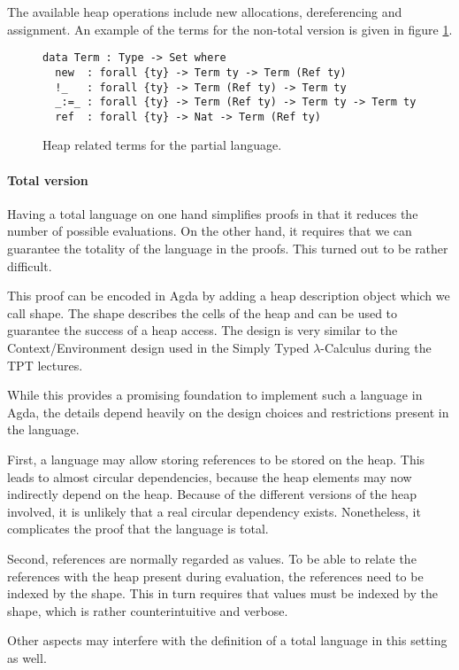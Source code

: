 \documentclass[12pt, a4paper, oneside]{article}
\begin{document}
The available heap operations include new allocations, dereferencing and assignment. An example of the
terms for the non-total version is given in figure \ref{lst:part-term}.

\begin{figure}
{\scriptsize
\begin{lstlisting}
data Term : Type -> Set where
  new  : forall {ty} -> Term ty -> Term (Ref ty)
  !_   : forall {ty} -> Term (Ref ty) -> Term ty
  _:=_ : forall {ty} -> Term (Ref ty) -> Term ty -> Term ty
  ref  : forall {ty} -> Nat -> Term (Ref ty)
\end{lstlisting}}
\caption{Heap related terms for the partial language.}
\label{lst:part-term}
\end{figure}

\paragraph{Total version}
Having a total language on one hand simplifies proofs in that it reduces the number of possible evaluations.
On the other hand, it requires that we can guarantee the totality of the language in the proofs. This turned
out to be rather difficult.

This proof can be encoded in Agda by adding a heap description object which we call shape. The shape
describes the cells of the heap and can be used to guarantee the success of a heap access. The design
is very similar to the Context/Environment design used in the Simply Typed $\lambda$-Calculus
during the TPT lectures.

While this provides a promising foundation to implement such a language in Agda, the details depend
heavily on the design choices and restrictions present in the language.

First, a language may allow storing references to be stored on the heap. This leads to almost circular
dependencies, because the heap elements may now indirectly depend on the heap. Because of the different
versions of the heap involved, it is unlikely that a real circular dependency exists. Nonetheless,
it complicates the proof that the language is total.

Second, references are normally regarded as values. To be able to relate the references with the
heap present during evaluation, the references need to be indexed by the shape. This in turn requires
that values must be indexed by the shape, which is rather counterintuitive and verbose.

Other aspects may interfere with the definition of a total language in this setting as well.
\end{document}
